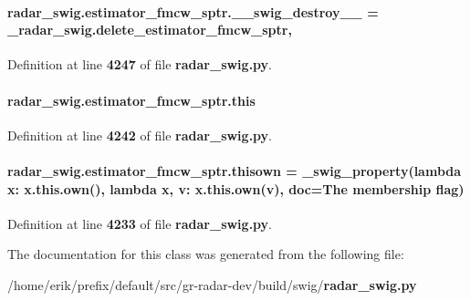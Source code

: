 \paragraph[{\+\_\+\+\_\+swig\+\_\+destroy\+\_\+\+\_\+}]{\setlength{\rightskip}{0pt plus 5cm}radar\+\_\+swig.\+estimator\+\_\+fmcw\+\_\+sptr.\+\_\+\+\_\+swig\+\_\+destroy\+\_\+\+\_\+ = \+\_\+radar\+\_\+swig.\+delete\+\_\+estimator\+\_\+fmcw\+\_\+sptr\hspace{0.3cm}{\ttfamily [static]}, {\ttfamily [private]}}\label{classradar__swig_1_1estimator__fmcw__sptr_acd3222c1a11f2a25f1f400488a747bab}


Definition at line {\bf 4247} of file {\bf radar\+\_\+swig.\+py}.

\paragraph[{this}]{\setlength{\rightskip}{0pt plus 5cm}radar\+\_\+swig.\+estimator\+\_\+fmcw\+\_\+sptr.\+this}\label{classradar__swig_1_1estimator__fmcw__sptr_adb46726e2e4b9d5d26225cf851f70eeb}


Definition at line {\bf 4242} of file {\bf radar\+\_\+swig.\+py}.

\paragraph[{thisown}]{\setlength{\rightskip}{0pt plus 5cm}radar\+\_\+swig.\+estimator\+\_\+fmcw\+\_\+sptr.\+thisown = {\bf \+\_\+swig\+\_\+property}(lambda x\+: x.\+this.\+own(), lambda {\bf x}, v\+: x.\+this.\+own(v), doc=\textquotesingle{}The membership flag\textquotesingle{})\hspace{0.3cm}{\ttfamily [static]}}\label{classradar__swig_1_1estimator__fmcw__sptr_a7c3aabaeedba071bad50b9972da8674e}


Definition at line {\bf 4233} of file {\bf radar\+\_\+swig.\+py}.



The documentation for this class was generated from the following file\+:\begin{DoxyCompactItemize}
\item 
/home/erik/prefix/default/src/gr-\/radar-\/dev/build/swig/{\bf radar\+\_\+swig.\+py}\end{DoxyCompactItemize}
